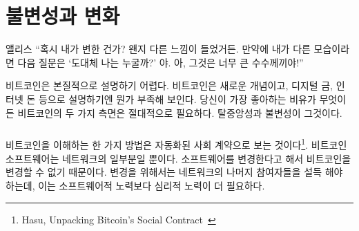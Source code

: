 \chapter{불변성과 변화}
\label{les:1}

\begin{chapquote}{앨리스}
\enquote{혹시 내가 변한 건가?
왠지 다른 느낌이 들었거든. 만약에 내가 다른 모습이라면 다음 질문은 `도대체 나는 누굴까?' 야.
아, 그것은 너무 큰 수수께끼야!}
\end{chapquote}



비트코인은 본질적으로 설명하기 어렵다. 
비트코인은 새로운 개념이고, 디지털 금, 인터넷 돈 등으로 설명하기엔 뭔가 부족해 보인다. 
당신이 가장 좋아하는 비유가 무엇이든 비트코인의 두 가지 측면은 절대적으로 필요하다. 
탈중앙성과 불변성이 그것이다.

\paragraph{}
비트코인을 이해하는 한 가지 방법은 자동화된 사회 계약으로 보는 것이다\footnote{Hasu, Unpacking Bitcoin's Social Contract~\cite{social-contract}}. 
비트코인 소프트웨어는 네트워크의 일부분일 뿐이다. 
소프트웨어를 변경한다고 해서 비트코인을 변경할 수 없기 때문이다. 
변경을 위해서는 네트워크의 나머지 참여자들을 설득 해야 하는데, 
이는 소프트웨어적 노력보다 심리적 노력이 더 필요하다.


